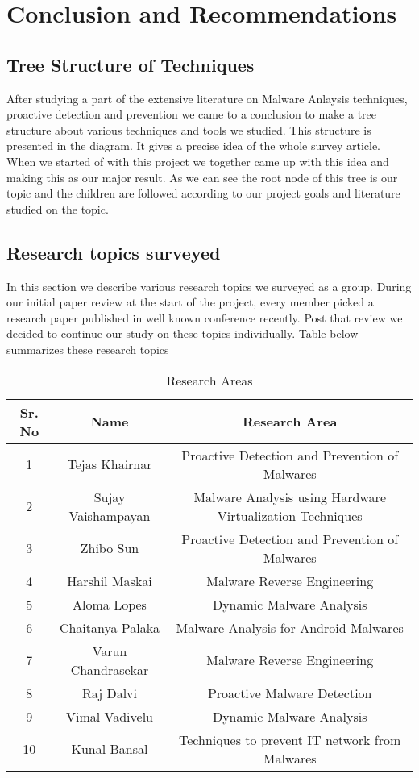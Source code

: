 \documentclass[11pt]{article}
\begin{document}
	
	

	\section{Conclusion and Recommendations}
	\subsection{Tree Structure of Techniques}
	After studying a part of the extensive literature on Malware Anlaysis techniques, proactive detection and prevention we came to a conclusion to make a tree structure about various techniques and tools we studied. This structure is presented in the diagram. It gives a precise idea of the whole survey article. When we started of with this project we together came up with this idea and making this as our major result. 
	As we can see the root node of this tree is our topic and the children are followed according to our project goals and literature studied on the topic.
	
	\subsection{Research topics surveyed}
	In this section we describe various research topics we surveyed as a group. During our initial paper review at the start of the project, every member picked a research paper published in well known conference recently. Post that review we decided to continue our study on these topics individually. Table below summarizes these research topics 
	\begin{table}
		\centering
		\begin{tabular}{ccc}
			\hline
			Sr. No & Name & Research Area\\
			\hline
			1 & Tejas Khairnar & Proactive Detection and Prevention of Malwares\\
			\hline
			2 & Sujay Vaishampayan & Malware Analysis using Hardware Virtualization	Techniques\\
			\hline
			3 & Zhibo Sun & Proactive Detection and Prevention of Malwares\\
			\hline
			4 & Harshil Maskai & Malware Reverse Engineering\\
			\hline
			5 & Aloma Lopes & Dynamic Malware Analysis\\
			\hline
			6 & Chaitanya Palaka & Malware Analysis for Android Malwares\\
			\hline
			7 & Varun Chandrasekar & Malware Reverse Engineering\\
			\hline
			8 & Raj Dalvi & Proactive Malware Detection\\
			\hline
			9 & Vimal Vadivelu & Dynamic Malware Analysis\\
			\hline
			10 & Kunal Bansal & Techniques to prevent IT network from Malwares\\
			\hline
		\end{tabular}
	\caption[]{Research Areas}
	\label{tab:Research_Areas}
	\end{table}
\end{document}
